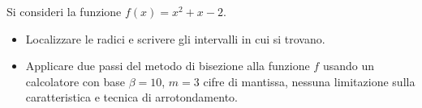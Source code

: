 Si consideri la funzione $f(x)=x^2+x-2$.
\begin{itemize}
\item  Localizzare le radici e
scrivere gli intervalli in cui si trovano.
\item Applicare due passi del
metodo di bisezione alla funzione $f$ usando un calcolatore con
base $\beta =10$, $m=3$ cifre di mantissa, nessuna limitazione
sulla caratteristica e tecnica di arrotondamento.
\end{itemize}
